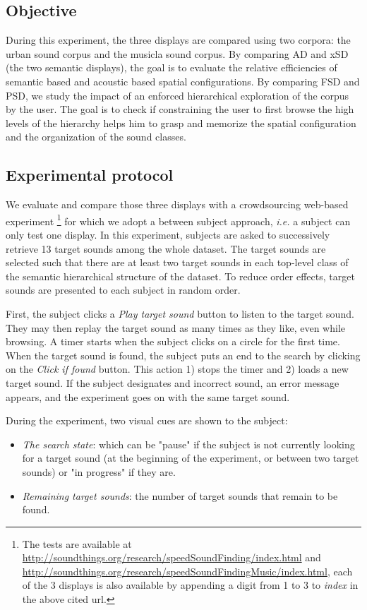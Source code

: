 \documentclass{aes2e}
\begin{document}
\subsection{Objective}

During this experiment, the three displays are compared using two corpora: the urban sound corpus and the musicla sound corpus. By comparing AD and xSD (the two semantic displays), the goal is to evaluate the  relative efficiencies of semantic based and acoustic based spatial configurations. By comparing FSD and PSD, we study the impact of an enforced hierarchical exploration of the corpus by the user. The goal is to check if constraining the user to first browse the high levels of the hierarchy helps him to grasp and memorize the spatial configuration and the organization of the sound classes. 

\subsection{Experimental protocol}

We evaluate and compare those three displays with a crowdsourcing web-based experiment \footnote{The tests are available at \url{http://soundthings.org/research/speedSoundFinding/index.html} and \url{http://soundthings.org/research/speedSoundFindingMusic/index.html}, each of the 3 displays is also available by appending a digit from 1 to 3 to \textit{index} in the above cited url.} for which we adopt a between subject approach, \textit{i.e.} a subject can only test one display. In this experiment, subjects are asked to successively retrieve 13 target sounds among the whole dataset. The target sounds are selected such that there are at least two target sounds in each top-level class of the semantic hierarchical structure of the dataset. To reduce order effects, target sounds are presented to each subject in random order.

First, the subject clicks a \textit{Play target sound} button to listen to the target sound. They may then replay the target sound as many times as they like, even while browsing. A timer starts when the subject clicks on a circle for the first time. When the target sound is found, the subject puts an end to the search by clicking on the \textit{Click if found} button. This action 1) stops the timer and 2) loads a new target sound. If the subject designates and incorrect sound, an error message appears, and the experiment goes on with the same target sound.

During the experiment, two visual cues are shown to the subject:
\begin{itemize}
\item \textit{The search state}: which can be "pause" if the subject is not currently looking for a target sound (at the beginning of the experiment, or between two target sounds) or  "in progress"  if they are.
\item \textit{Remaining target sounds}: the number of target sounds that remain to be found.
\end{itemize}
\end{document}
